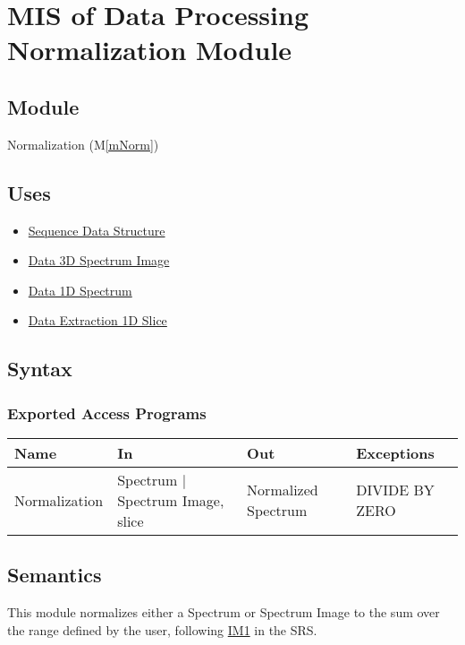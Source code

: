 \documentclass[12pt, titlepage]{article}
\newcommand{\mref}[1]{M\ref{#1}}
\begin{document}
\newpage
\section{MIS of Data Processing Normalization Module} \label{Mod:Normalization}

\subsection{Module}
Normalization (\mref{mNorm})

\subsection{Uses}
\begin{itemize}
    \item \hyperref[Mod:Seq]{Sequence Data Structure}
    \item \hyperref[Mod:SI]{Data 3D Spectrum Image}
    \item \hyperref[Mod:Spectrum]{Data 1D Spectrum}
    \item \hyperref[Mod:Slice1D]{Data Extraction 1D Slice}
\end{itemize}

\subsection{Syntax}

\subsubsection{Exported Access Programs}

\begin{center}
    \begin{tabular}{p{3cm} p{4cm} p{4cm} p{2cm}}
        \hline
        \textbf{Name} & \textbf{In} & \textbf{Out} & \textbf{Exceptions} \\
        \hline
        Normalization & Spectrum $|$ Spectrum Image, slice & Normalized Spectrum &
        DIVIDE BY ZERO \\
        \hline
    \end{tabular}
\end{center}

\subsection{Semantics}
This module normalizes either a Spectrum or Spectrum Image to the sum over the
range defined by the user, following \hyperref[normalization]{IM1} in the SRS.
\end{document}
